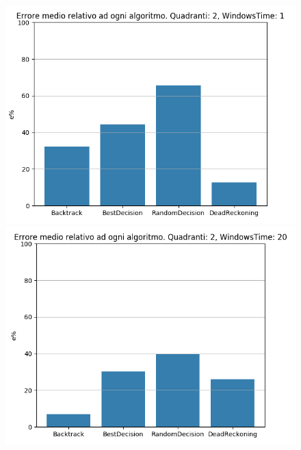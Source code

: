 \documentclass[12pt,a4paper,openright,twoside]{report}
\begin{document}
\begin{figure}[H]
\centering 
\includegraphics[scale=0.4]{secondChart2-1} 
\includegraphics[scale=0.4]{secondChart2-20} 
\end{figure}
\end{document}
